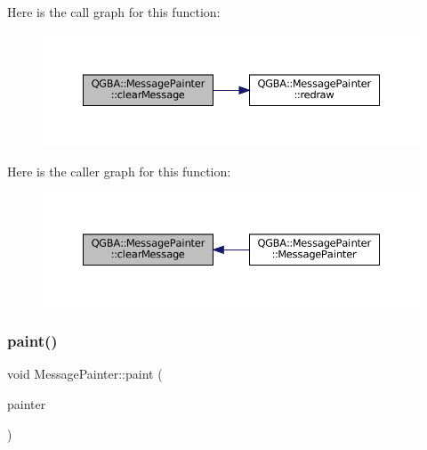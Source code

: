 Here is the call graph for this function\+:
\nopagebreak
\begin{figure}[H]
\begin{center}
\leavevmode
\includegraphics[width=350pt]{class_q_g_b_a_1_1_message_painter_a6880cc16df94e00ff0d57869f93022b0_cgraph}
\end{center}
\end{figure}
Here is the caller graph for this function\+:
\nopagebreak
\begin{figure}[H]
\begin{center}
\leavevmode
\includegraphics[width=350pt]{class_q_g_b_a_1_1_message_painter_a6880cc16df94e00ff0d57869f93022b0_icgraph}
\end{center}
\end{figure}
\mbox{\label{class_q_g_b_a_1_1_message_painter_a2c8a4b2a2935f3d1033260768aa36796}} 
\subsubsection{\texorpdfstring{paint()}{paint()}}
{\footnotesize\ttfamily void Message\+Painter\+::paint (\begin{DoxyParamCaption}\item[{Q\+Painter $\ast$}]{painter }\end{DoxyParamCaption})}

